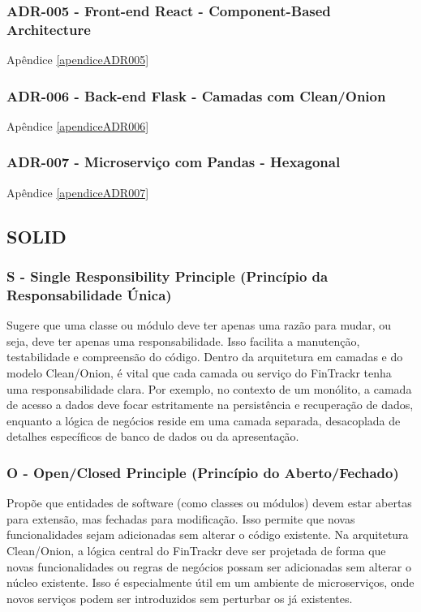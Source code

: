 \subsubsection*{ADR-005 - Front-end React - Component-Based Architecture}
Apêndice \ref{apendiceADR005}

\subsubsection*{ADR-006 - Back-end Flask - Camadas com Clean/Onion}
Apêndice \ref{apendiceADR006}

\subsubsection*{ADR-007 - Microserviço com Pandas - Hexagonal}
Apêndice \ref{apendiceADR007}

\subsection{SOLID}

\subsubsection*{S - Single Responsibility Principle (Princípio da Responsabilidade Única)}
Sugere que uma classe ou módulo deve ter apenas uma razão para mudar, ou seja, deve ter apenas uma responsabilidade. Isso facilita a manutenção, testabilidade e compreensão do código. Dentro da arquitetura em camadas e do modelo Clean/Onion, é vital que cada camada ou serviço do FinTrackr tenha uma responsabilidade clara. Por exemplo, no contexto de um monólito, a camada de acesso a dados deve focar estritamente na persistência e recuperação de dados, enquanto a lógica de negócios reside em uma camada separada, desacoplada de detalhes específicos de banco de dados ou da apresentação.

\subsubsection*{O - Open/Closed Principle (Princípio do Aberto/Fechado)}
Propõe que entidades de software (como classes ou módulos) devem estar abertas para extensão, mas fechadas para modificação. Isso permite que novas funcionalidades sejam adicionadas sem alterar o código existente. Na arquitetura Clean/Onion, a lógica central do FinTrackr deve ser projetada de forma que novas funcionalidades ou regras de negócios possam ser adicionadas sem alterar o núcleo existente. Isso é especialmente útil em um ambiente de microserviços, onde novos serviços podem ser introduzidos sem perturbar os já existentes.

